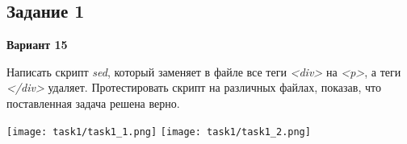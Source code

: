 \documentclass[12pt, a4paper]{report}
\begin{document}
	\subsection*{Задание 1}
	\large
	\begin{center}
		\textbf{Вариант 15}
	\end{center}
	\par
	Написать скрипт \textit{sed}, который заменяет в файле все теги \textit{<div>} на \textit{<p>}, а теги \textit{</div>} удаляет. Протестировать скрипт на различных файлах, показав, что поставленная задача решена верно.
	\lstset{style=mystyle}
	
	
	\begin{center}
		\texttt{[image: task1/task1\_1.png]}
		\texttt{[image: task1/task1\_2.png]}
	\end{center}
\end{document}
